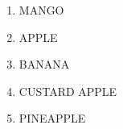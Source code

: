 \documentclass{article}
\begin{document}
\begin{enumerate}
\item MANGO
\item APPLE
\item BANANA
\item CUSTARD APPLE
\item PINEAPPLE
\end{enumerate}
\end{document}
